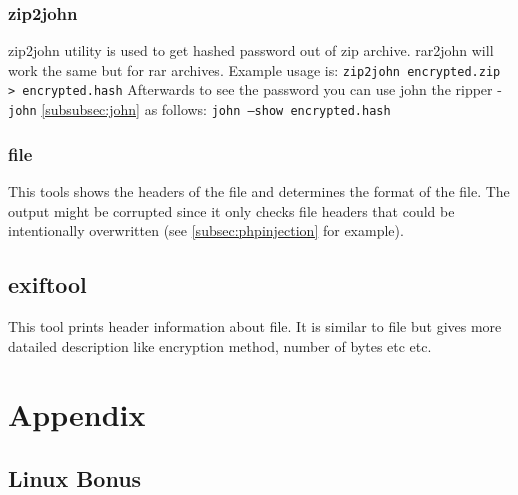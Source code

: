 \documentclass{article}[12pt]
\newcommand{\q}[1]{\texttt{#1}}
\begin{document}
\subsubsection{zip2john}
zip2john utility is used to get hashed password out of zip archive.
rar2john will work the same but for rar archives.
Example usage is:\newline
\q{zip2john encrypted.zip > encrypted.hash} \newline
Afterwards to see the password you can use john the ripper - \q{john} \ref{subsubsec:john} as follows: \newline
\q{john  --show encrypted.hash}
\subsubsection{file}
\label{subsubsec:file}
This tools shows the headers of the file and determines the format of the file.
The output might be corrupted since it only checks file headers that could be intentionally overwritten (see \ref{subsec:phpinjection} for example).
\subsection{exiftool}
This tool prints header information about file.
It is similar to file but gives more datailed description like encryption method, number of bytes etc etc.




\section{Appendix}

\subsection{Linux Bonus}
\end{document}
